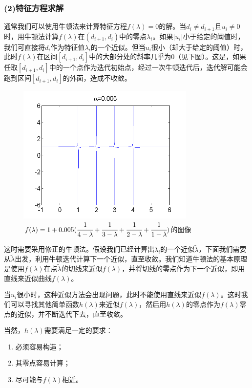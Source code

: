 \documentclass[notheorems,serif]{beamer}
\begin{document}
\begin{frame}
\frametitle{(2)特征方程求解}


通常我们可以使用牛顿法来计算特征方程$f(\lambda)=0$的解。当$d_i\neq d_{i+1}$且$u_i\neq 0$时，用牛顿法计算$f(\lambda)$在$(d_{i+1},d_i)$中的零点$\lambda _i$。如果$|u_i|$小于给定的阈值时，我们可直接将$d_i$作为特征值$\lambda _i$的一个近似。但当$u_i$很小（却大于给定的阈值）时，此时$f(\lambda)$在区间$[d_{i+1},d_i]$中的大部分处的斜率几乎为0（见下图）。这是，如果任取$[d_{i+1},d_i]$中的一个点作为迭代初始点，经过一次牛顿迭代后，迭代解可能会跑到区间$[d_{i+1},d_i]$的外面，造成不收敛。
\begin{figure}[H]
	\centering
	\includegraphics[scale=0.4]{figurest/figure_3.png}
	\caption{$f(\lambda)=1+0.005(\cfrac{1}{4-\lambda}+\cfrac{1}{3-\lambda}+\cfrac{1}{2-\lambda}+\cfrac{1}{1-\lambda})$的图像}
\end{figure}
\end{frame}
\begin{frame}
这时需要采用修正的牛顿法。假设我们已经计算出$\lambda _i$的一个近似$\tilde{\lambda}$，下面我们需要从$\tilde{\lambda}$出发，利用牛顿迭代计算下一个近似，直至收敛。我们知道牛顿法的基本原理是使用$f(\lambda)$在点$\tilde{\lambda}$的切线来近似$f(\lambda)$，并将切线的零点作为下一个近似，即用直线来近似曲线$f(\lambda)$。

当$u_i$很小时，这种近似方法会出现问题，此时不能使用直线来近似$f(\lambda)$。这时我们可以寻找其他简单函数$h(\lambda)$来近似$f(\lambda)$，然后用$h(\lambda)$的零点作为$f(\lambda)$零点的近似，并不断迭代下去，直至收敛。

当然，$h(\lambda)$需要满足一定的要求：
\begin{enumerate}[（1）]
	\item 必须容易构造；
	\item 其零点容易计算；
	\item 尽可能与$f(\lambda)$相近。
\end{enumerate}
\end{frame}
\end{document}
